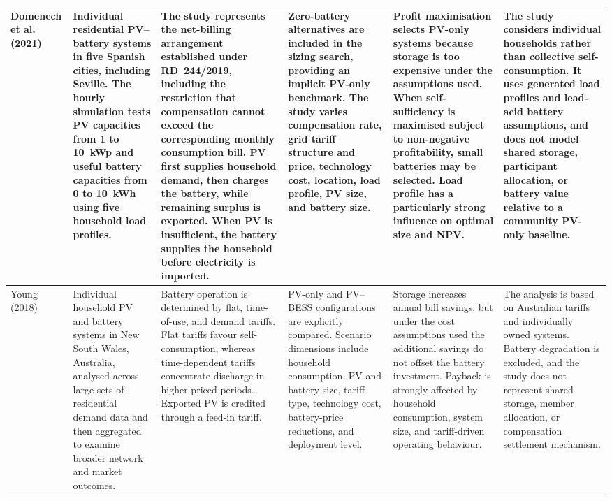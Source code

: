 \begin{landscape}
\begin{longtable}{
p{2.5cm}
p{3.2cm}
p{3.9cm}
p{3.6cm}
p{3.5cm}
p{5.0cm}
}
\\ \midrule

Domenech et al. (2021)
\cite{ch2ref062}
&
Individual residential PV--battery systems in five Spanish cities,
including Seville. The hourly simulation tests PV capacities from 1 to
10~kWp and useful battery capacities from 0 to 10~kWh using five
household load profiles.
&
The study represents the net-billing arrangement established under
RD~244/2019, including the restriction that compensation cannot exceed
the corresponding monthly consumption bill. PV first supplies household
demand, then charges the battery, while remaining surplus is exported.
When PV is insufficient, the battery supplies the household before
electricity is imported.
&
Zero-battery alternatives are included in the sizing search, providing
an implicit PV-only benchmark. The study varies compensation rate, grid
tariff structure and price, technology cost, location, load profile, PV
size, and battery size.
&
Profit maximisation selects PV-only systems because storage is too
expensive under the assumptions used. When self-sufficiency is
maximised subject to non-negative profitability, small batteries may be
selected. Load profile has a particularly strong influence on optimal
size and NPV.
&
The study considers individual households rather than collective
self-consumption. It uses generated load profiles and lead-acid battery
assumptions, and does not model shared storage, participant allocation,
or battery value relative to a community PV-only baseline.

\\ \midrule

Young (2018)
\cite{ch2ref066}
&
Individual household PV and battery systems in New South Wales,
Australia, analysed across large sets of residential demand data and
then aggregated to examine broader network and market outcomes.
&
Battery operation is determined by flat, time-of-use, and demand
tariffs. Flat tariffs favour self-consumption, whereas time-dependent
tariffs concentrate discharge in higher-priced periods. Exported PV is
credited through a feed-in tariff.
&
PV-only and PV--BESS configurations are explicitly compared. Scenario
dimensions include household consumption, PV and battery size, tariff
type, technology cost, battery-price reductions, and deployment level.
&
Storage increases annual bill savings, but under the cost assumptions
used the additional savings do not offset the battery investment.
Payback is strongly affected by household consumption, system size, and
tariff-driven operating behaviour.
&
The analysis is based on Australian tariffs and individually owned
systems. Battery degradation is excluded, and the study does not
represent shared storage, member allocation, or compensation settlement mechanism.

\end{longtable}
\endgroup
\end{landscape}

